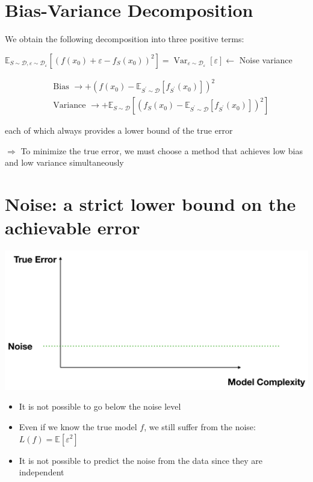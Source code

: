 \documentclass[10pt]{article}
\begin{document}
\section*{Bias-Variance Decomposition}
We obtain the following decomposition into three positive terms:

$\mathbb{E}_{S \sim \mathscr{D}, \varepsilon \sim \mathscr{D}_{\varepsilon}}\left[\left(f\left(x_{0}\right)+\varepsilon-f_{S}\left(x_{0}\right)\right)^{2}\right]=\operatorname{Var}_{\varepsilon \sim \mathscr{D}_{\varepsilon}}[\varepsilon] \longleftarrow$ Noise variance

$$
\begin{aligned}
& \text { Bias } \longrightarrow+\left(f\left(x_{0}\right)-\mathbb{E}_{S^{\prime} \sim \mathscr{D}}\left[f_{S^{\prime}}\left(x_{0}\right)\right]\right)^{2} \\
& \text { Variance } \longrightarrow+\mathbb{E}_{S \sim \mathscr{D}}\left[\left(f_{S}\left(x_{0}\right)-\mathbb{E}_{S^{\prime} \sim \mathscr{D}}\left[f_{S^{\prime}}\left(x_{0}\right)\right]\right)^{2}\right]
\end{aligned}
$$

each of which always provides a lower bound of the true error

$\Rightarrow$ To minimize the true error, we must choose a method that achieves low bias and low variance simultaneously

\section*{Noise: a strict lower bound on the achievable error}
\begin{center}
\includegraphics[max width=\textwidth]{2023_12_30_442f876157646883c2c9g-22}
\end{center}

\begin{itemize}
  \item It is not possible to go below the noise level

  \item Even if we know the true model $f$, we still suffer from the noise: $L(f)=\mathbb{E}\left[\varepsilon^{2}\right]$

  \item It is not possible to predict the noise from the data since they are independent

\end{itemize}
\end{document}
